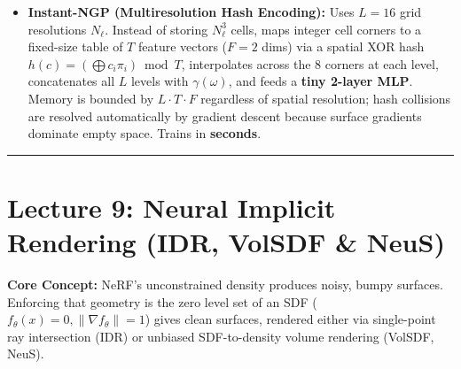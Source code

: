 \documentclass[10pt, a4paper]{article}
\newcommand{\hr}{\vspace{0.8em}\hrule\vspace{0.8em}}
\begin{document}
\begin{itemize}
\begin{itemize}
        \item \textbf{Instant-NGP (Multiresolution Hash Encoding):} Uses $L=16$ grid resolutions $N_\ell$. Instead of storing $N_\ell^3$ cells, maps integer cell corners to a fixed-size table of $T$ feature vectors ($F=2$ dims) via a spatial XOR hash $h(c) = (\bigoplus c_i\pi_i) \bmod T$, interpolates across the 8 corners at each level, concatenates all $L$ levels with $\gamma(\omega)$, and feeds a \textbf{tiny 2-layer MLP}. Memory is bounded by $L\cdot T\cdot F$ regardless of spatial resolution; hash collisions are resolved automatically by gradient descent because surface gradients dominate empty space. Trains in \textbf{seconds}.
    \end{itemize}
\end{itemize}

\hr
\section*{\textcolor{primary}{Lecture 9: Neural Implicit Rendering (IDR, VolSDF \& NeuS)}}
\textbf{Core Concept:} NeRF's unconstrained density produces noisy, bumpy surfaces. Enforcing that geometry is the zero level set of an SDF ($f_\theta(x)=0, \|\nabla f_\theta\|=1$) gives clean surfaces, rendered either via single-point ray intersection (IDR) or unbiased SDF-to-density volume rendering (VolSDF, NeuS).
\end{document}
